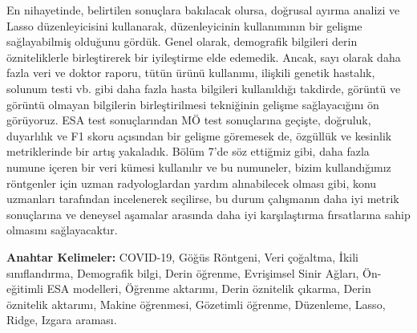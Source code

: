 En nihayetinde, belirtilen sonuçlara bakılacak olursa, doğrusal ayırma analizi ve Lasso düzenleyicisini kullanarak, düzenleyicinin kullanımının bir gelişme sağlayabilmiş olduğunu gördük. Genel olarak, demografik bilgileri derin özniteliklerle birleştirerek bir iyileştirme elde edemedik. Ancak, sayı olarak daha fazla veri ve doktor raporu, tütün ürünü kullanımı, ilişkili genetik hastalık, solunum testi vb. gibi daha fazla hasta bilgileri kullanıldığı takdirde, görüntü ve görüntü olmayan bilgilerin birleştirilmesi tekniğinin gelişme sağlayacığını ön görüyoruz. ESA test sonuçlarından MÖ test sonuçlarına geçişte, doğruluk, duyarlılık ve F1 skoru açısından bir gelişme göremesek de, özgüllük ve kesinlik metriklerinde bir artış yakaladık. Bölüm 7'de söz ettiğmiz gibi, daha fazla numune içeren bir veri kümesi kullanılır ve bu numuneler, bizim kullandığımız röntgenler için uzman radyologlardan yardım alınabilecek olması gibi, konu uzmanları tarafından incelenerek seçilirse, bu durum çalışmanın daha iyi metrik sonuçlarına ve deneysel aşamalar arasında daha iyi karşılaştırma fırsatlarına sahip olmasını sağlayacaktır.

\textbf{Anahtar Kelimeler:} COVID-19, Göğüs Röntgeni, Veri çoğaltma, İkili sınıflandırma, Demografik bilgi, Derin öğrenme, Evrişimsel Sinir Ağları, Ön-eğitimli ESA modelleri, Öğrenme aktarımı, Derin öznitelik çıkarma, Derin öznitelik aktarımı, Makine öğrenmesi, Gözetimli öğrenme, Düzenleme, Lasso, Ridge, Izgara araması.